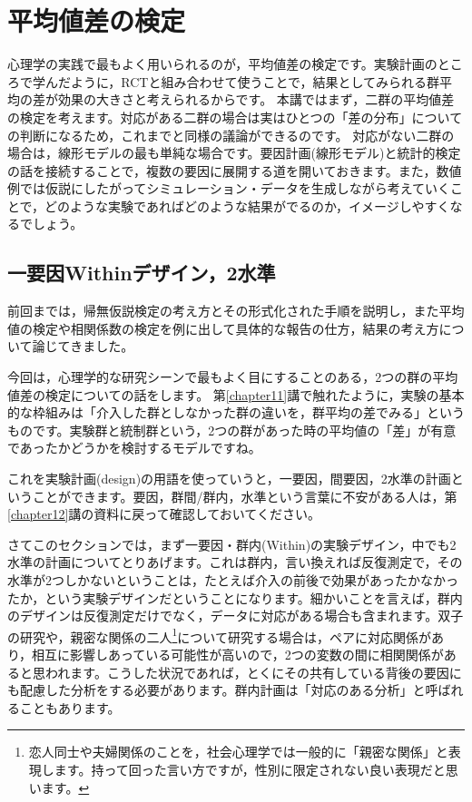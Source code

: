 \documentclass{ltjsarticle}
\begin{document}
\chapter{平均値差の検定}
\label{chapter19}
心理学の実践で最もよく用いられるのが，平均値差の検定です。実験計画のところで学んだように，RCTと組み合わせて使うことで，結果としてみられる群平均の差が効果の大きさと考えられるからです。
本講ではまず，二群の平均値差の検定を考えます。対応がある二群の場合は実はひとつの「差の分布」についての判断になるため，これまでと同様の議論ができるのです。
対応がない二群の場合は，線形モデルの最も単純な場合です。要因計画(線形モデル)と統計的検定の話を接続することで，複数の要因に展開する道を開いておきます。また，数値例では仮説にしたがってシミュレーション・データを生成しながら考えていくことで，どのような実験であればどのような結果がでるのか，イメージしやすくなるでしょう。

\section{一要因Withinデザイン，2水準}
前回までは，帰無仮説検定の考え方とその形式化された手順を説明し，また平均値の検定や相関係数の検定を例に出して具体的な報告の仕方，結果の考え方について論じてきました。

今回は，心理学的な研究シーンで最もよく目にすることのある，2つの群の平均値差の検定についての話をします。
第\ref{chapter11}講で触れたように，実験の基本的な枠組みは「介入した群としなかった群の違いを，群平均の差でみる」というものです。実験群と統制群という，2つの群があった時の平均値の「差」が有意であったかどうかを検討するモデルですね。

これを実験計画(design)の用語を使っていうと，一要因，間要因，2水準の計画ということができます。要因，群間/群内，水準という言葉に不安がある人は，第\ref{chapter12}講の資料に戻って確認しておいてください。

さてこのセクションでは，まず一要因・群内(Within)の実験デザイン，中でも2水準の計画についてとりあげます。これは群内，言い換えれば反復測定で，その水準が2つしかないということは，たとえば介入の前後で効果があったかなかったか，という実験デザインだということになります。細かいことを言えば，群内のデザインは反復測定だけでなく，データに対応がある場合も含まれます。双子の研究や，親密な関係の二人\footnote{恋人同士や夫婦関係のことを，社会心理学では一般的に「親密な関係」と表現します。持って回った言い方ですが，性別に限定されない良い表現だと思います。}について研究する場合は，ペアに対応関係があり，相互に影響しあっている可能性が高いので，2つの変数の間に相関関係があると思われます。こうした状況であれば，とくにその共有している背後の要因にも配慮した分析をする必要があります。群内計画は「対応のある分析」と呼ばれることもあります。
\end{document}
